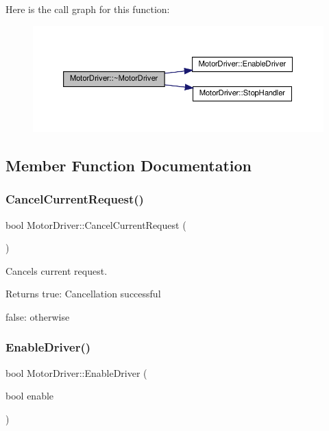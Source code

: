 Here is the call graph for this function\+:
\nopagebreak
\begin{figure}[H]
\begin{center}
\leavevmode
\includegraphics[width=350pt]{classMotorDriver_a6ead9d8f796501adf9889a8e5aa7afc5_cgraph}
\end{center}
\end{figure}


\subsection{Member Function Documentation}
\mbox{\label{classMotorDriver_af1a7f20e03d76a0c1dac5e2080edd832}} 
\subsubsection{\texorpdfstring{Cancel\+Current\+Request()}{CancelCurrentRequest()}}
{\footnotesize\ttfamily bool Motor\+Driver\+::\+Cancel\+Current\+Request (\begin{DoxyParamCaption}{ }\end{DoxyParamCaption})}



Cancels current request. 

\begin{DoxyReturn}{Returns}
true\+: Cancellation successful 

false\+: otherwise 
\end{DoxyReturn}
\mbox{\label{classMotorDriver_a754252fe0d18118e074cbdc1fe42da57}} 
\subsubsection{\texorpdfstring{Enable\+Driver()}{EnableDriver()}}
{\footnotesize\ttfamily bool Motor\+Driver\+::\+Enable\+Driver (\begin{DoxyParamCaption}\item[{bool}]{enable }\end{DoxyParamCaption})\hspace{0.3cm}{\ttfamily [private]}}



